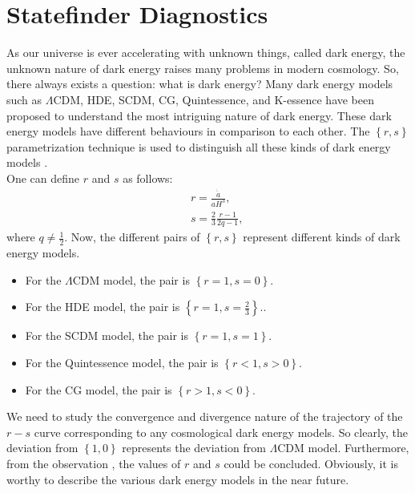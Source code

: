 \documentclass[aps,prd,showpacs,nofootinbib,floats,floatfix,preprintnumbers,groupedaddress,twocolumn]{revtex4-1}
\def \ben{\begin{eqnarray}}
\def \een{\end{eqnarray}}
\begin{document}
    
\section{Statefinder Diagnostics}\label{IX}
\noindent
    As our universe is ever accelerating with unknown things, called dark energy, the unknown nature of dark energy raises many problems in modern cosmology. So, there always exists a question: what is dark energy? Many dark energy models such as $\Lambda$CDM, HDE, SCDM, CG, Quintessence, and K-essence have been proposed to understand the most intriguing nature of dark energy. These dark energy models have different behaviours in comparison to each other. The $\left\lbrace r,s\right\rbrace$ parametrization technique is used to distinguish all these kinds of dark energy models \cite{Sahni,Alam}.\\
    One can define $r$ and $s$ as follows:
\ben
    &&r=\frac{\dot{\ddot{a}}}{aH^3},\label{52}
    \\
    &&s=\frac{2}{3}\frac{r-1}{2q-1},\label{53}
\een
    where $q\neq \frac{1}{2}$. Now, the different pairs of $\left\lbrace r,s\right\rbrace$ represent different kinds of dark energy models.

\begin{itemize}
    \item[(a).] For the $\Lambda$CDM model, the pair is $\left\lbrace r=1,s=0\right\rbrace$.

    \item[(b).] For the HDE model, the pair is $\left\lbrace r=1,s=\frac{2}{3}\right\rbrace$..

    \item[(c).] For the SCDM model, the pair is $\left\lbrace r=1,s=1\right\rbrace$. 

    \item[(d).] For the Quintessence model, the pair is $\left\lbrace r<1,s>0\right\rbrace$.

    \item[(e).] For the CG model, the pair is $\left\lbrace r>1,s<0\right\rbrace$. 
\end{itemize}

    We need to study the convergence and divergence nature of the trajectory of the $r-s$ curve corresponding to any cosmological dark energy models. So clearly, the deviation from $\left\lbrace 1,0 \right\rbrace$ represents the deviation from $\Lambda$CDM model. Furthermore, from the observation \cite{Albert,Albert2}, the values of $r$ and $s$ could be concluded. Obviously, it is worthy to describe the various dark energy models in the near future.
\end{document}
